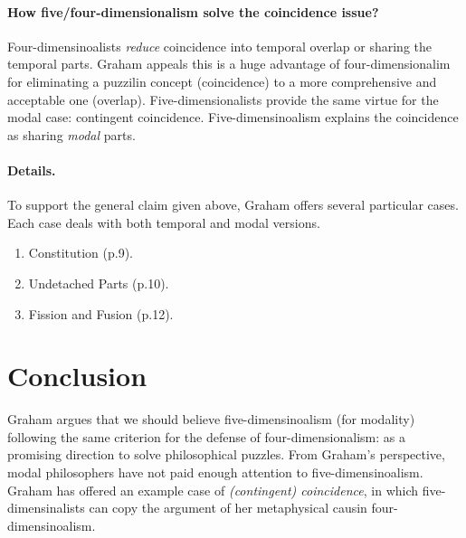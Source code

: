 \documentclass[
10pt, %
a4paper, %
twocolumn, %
landscape %
]{article}
\begin{document}
\paragraph{How five/four-dimensionalism solve the coincidence issue?}
Four-dimensinoalists \emph{reduce} coincidence into temporal overlap or sharing the temporal parts. Graham appeals this is a huge advantage of four-dimensionalim for eliminating a puzzilin concept (coincidence) to a more comprehensive and acceptable one (overlap).
Five-dimensionalists provide the same virtue for the modal case: contingent coincidence.
Five-dimensinoalism explains the coincidence as sharing \emph{modal} parts.

\paragraph{Details.}
To support the general claim given above,
Graham offers several particular cases. Each case deals with both temporal and modal versions.
\begin{enumerate}[label=(\alph*)]
  \item Constitution (p.9).
  \item Undetached Parts (p.10).
  \item Fission and Fusion (p.12).
\end{enumerate}

\section{Conclusion}
Graham argues that we should believe five-dimensinoalism (for modality) following the same criterion for the defense of four-dimensionalism: as a promising direction to solve philosophical puzzles.
From Graham's perspective, modal philosophers have not paid enough attention to five-dimensinoalism. Graham has offered an example case of \emph{(contingent) coincidence}, in which five-dimensinalists can copy the argument of her metaphysical causin four-dimensinoalism.





\end{document}
